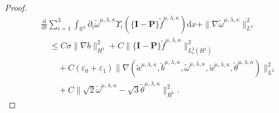 \documentclass[reqno,11pt]{amsart}
\theoremstyle{plain}
\numberwithin{equation}{section}
\newcommand{\eps}{{\varepsilon}}
\begin{document}
\begin{proof}
\begin{align}
& \frac{\mathrm{d}}{\mathrm{d} t}   \sum_{ i=1}^3 \int_{\mathbb{R}^3}   \partial_i \widetilde\omega^{\mu,\lambda,\kappa}   \Upsilon_i(\{\mathbf{I}-\mathbf{P}\} \widetilde{f}^{\mu,\lambda,\kappa}) \mathrm{d} x+ \| \nabla  \widetilde\omega^{\mu,\lambda,\kappa} \|_{L^2}^2 \nonumber\\
&\quad \leq C\sigma\|\nabla b\|_{H^1}^2+C \|\{\mathbf{I}-\mathbf{P}\} \widetilde{f}^{\mu,\lambda,\kappa}\|_{L_v^2 (H^1 )}^2\nonumber\\
& \quad\quad  +C(\eps_0+\eps_1)\|\nabla(\widetilde{a}^{\mu,\lambda,\kappa},\widetilde{b}^{\mu,\lambda,\kappa},\widetilde\omega^{\mu,\lambda,\kappa},\widetilde{u}^{\mu,\lambda,\kappa},\widetilde\theta^{\mu,\lambda,\kappa})\|_{L^2}^2\nonumber\\
& \quad\quad   +C\|\sqrt{2} \widetilde\omega^{\mu,\lambda,\kappa}-\sqrt{3} \widetilde\theta^{\mu,\lambda,\kappa}\|_{H^1}^2. 
\end{align}


\end{proof}
\end{document}
